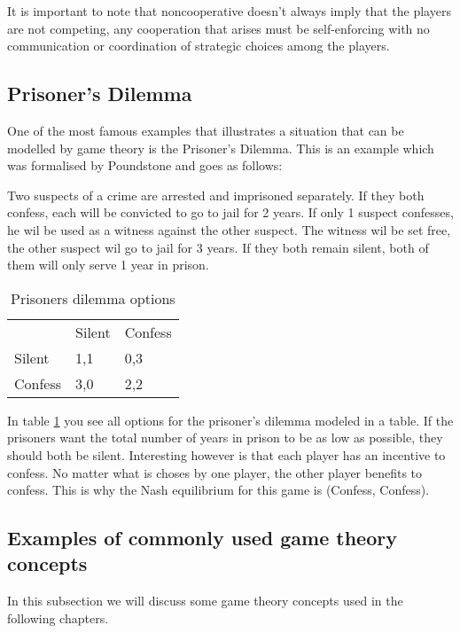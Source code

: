 It is important to note that noncooperative doesn't always imply that the players are not competing, any cooperation that arises must be self-enforcing with no communication or coordination of strategic choices among the players.\cite{keypaper}

\subsection{Prisoner's Dilemma}
One of the most famous examples that illustrates a situation that can be modelled by game theory is the Prisoner's Dilemma. This is an example which was formalised by Poundstone \cite{poundstone} and goes as follows: 

Two suspects of a crime are arrested and imprisoned separately. If they both confess, each will be convicted to go to jail for 2 years. If only 1 suspect confesses, he wil be used as a witness against the other suspect. The witness wil be set free, the other suspect wil go to jail for 3 years. If they both remain silent, both of them will only serve 1 year in prison.

\begin{table}[h]
\centering
\begin{tabular}{lll}
 & Silent & Confess \\ \cline{2-3} 
\multicolumn{1}{l|}{Silent} & \multicolumn{1}{l|}{1,1} & \multicolumn{1}{l|}{0,3} \\ \cline{2-3} 
\multicolumn{1}{l|}{Confess} & \multicolumn{1}{l|}{3,0} & \multicolumn{1}{l|}{2,2} \\ \cline{2-3} 
\end{tabular}
\caption{Prisoners dilemma options}
\label{prisoners-d}
\end{table}

In table \ref{prisoners-d} you see all options for the prisoner's dilemma modeled in a table. If the prisoners want the total number of years in prison to be as low as possible, they should both be silent. Interesting however is that each player has an incentive to confess. No matter what is choses by one player, the other player benefits to confess. This is why the Nash equilibrium for this game is (Confess, Confess).    

\subsection{Examples of commonly used game theory concepts}
In this subsection we will discuss some game theory concepts used in the following chapters.

